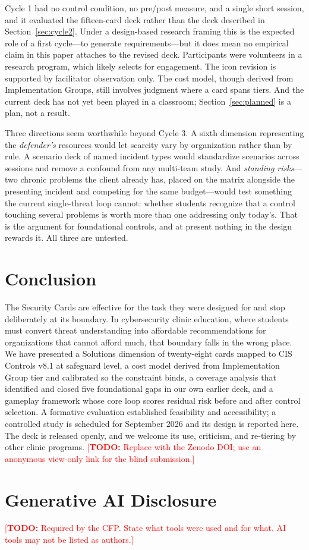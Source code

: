 \documentclass[10pt,twocolumn,letterpaper]{article}
\newcommand{\todo}[1]{\textcolor{red}{[\textbf{TODO:} #1]}}
\begin{document}
Cycle 1 had no control condition, no pre/post measure, and a single short
session, and it evaluated the fifteen-card deck rather than the deck described
in Section~\ref{sec:cycle2}. Under a design-based research framing this is the
expected role of a first cycle---to generate requirements---but it does mean no
empirical claim in this paper attaches to the revised deck. Participants were volunteers in a research program, which
likely selects for engagement. The icon revision is supported by facilitator
observation only. The cost model, though derived from Implementation Groups,
still involves judgment where a card spans tiers. And the current deck has not
yet been played in a classroom; Section~\ref{sec:planned} is a plan, not a
result.

Three directions seem worthwhile beyond Cycle 3. A sixth dimension representing
the \emph{defender's} resources would let scarcity vary by organization rather
than by rule. A scenario deck of named incident types would standardize scenarios
across sessions and remove a confound from any multi-team study. And
\emph{standing risks}---two chronic problems the client already has, placed on
the matrix alongside the presenting incident and competing for the same
budget---would test something the current single-threat loop cannot: whether
students recognize that a control touching several problems is worth more than
one addressing only today's. That is the argument for foundational controls, and
at present nothing in the design rewards it. All three are untested.

\section{Conclusion}

The Security Cards are effective for the task they were designed for and stop
deliberately at its boundary. In cybersecurity clinic education, where students
must convert threat understanding into affordable recommendations for
organizations that cannot afford much, that boundary falls in the wrong place.
We have presented a Solutions dimension of twenty-eight cards mapped to CIS
Controls v8.1 at safeguard level, a cost model derived from Implementation Group
tier and calibrated so the constraint binds, a coverage analysis that identified
and closed five foundational gaps in our own earlier deck, and a gameplay
framework whose core loop scores residual risk before and after control
selection. A formative evaluation established feasibility and accessibility; a
controlled study is scheduled for September 2026 and its design is reported
here. The deck is released openly, and we welcome its use, criticism, and
re-tiering by other clinic programs.
\todo{Replace with the Zenodo DOI; use an anonymous view-only link for the blind
submission.}

\section*{Generative AI Disclosure}
\todo{Required by the CFP. State what tools were used and for what. AI tools may
not be listed as authors.}


\end{document}
